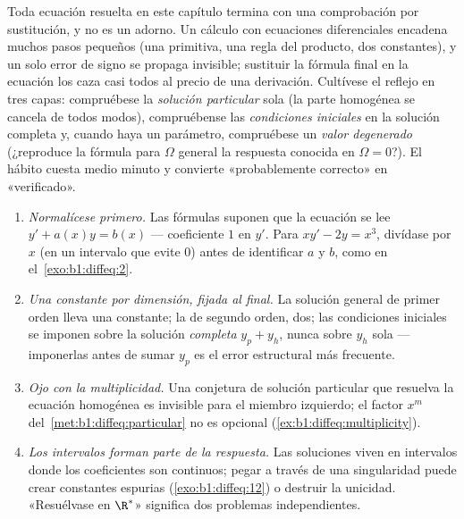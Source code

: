 \begin{remark}\label{rem:b1:diffeq:check}
Toda ecuación resuelta en este capítulo termina con una comprobación
por sustitución, y no es un adorno. Un cálculo con ecuaciones
diferenciales encadena muchos pasos pequeños (una primitiva, una regla
del producto, dos constantes), y un solo error de signo se propaga
invisible; sustituir la fórmula final en la ecuación los caza casi
todos al precio de una derivación. Cultívese el reflejo en tres capas:
compruébese la \emph{solución particular} sola (la parte homogénea se
cancela de todos modos), compruébense las \emph{condiciones iniciales}
en la solución completa y, cuando haya un parámetro, compruébese un
\emph{valor degenerado} (¿reproduce la fórmula para $\Omega$ general la
respuesta conocida en $\Omega = 0$?). El hábito cuesta medio minuto y
convierte «probablemente correcto» en «verificado».
\end{remark}

\begin{remark}\label{rem:b1:diffeq:pitfalls}
\begin{enumerate}
  \item \emph{Normalícese primero.} Las fórmulas suponen que la
        ecuación se lee $y' + a(x)y = b(x)$ --- coeficiente $1$ en
        $y'$. Para $xy' - 2y = x^3$, divídase por $x$ (en un intervalo
        que evite $0$) antes de identificar $a$ y $b$, como en
        el~\cref{exo:b1:diffeq:2}.
  \item \emph{Una constante por dimensión, fijada al final.} La
        solución general de primer orden lleva una constante; la de
        segundo orden, dos; las condiciones iniciales se imponen sobre
        la solución \emph{completa} $y_p + y_h$, nunca sobre $y_h$
        sola --- imponerlas antes de sumar $y_p$ es el error
        estructural más frecuente.
  \item \emph{Ojo con la multiplicidad.} Una conjetura de solución
        particular que resuelva la ecuación homogénea es invisible
        para el miembro izquierdo; el factor $x^m$
        del~\cref{met:b1:diffeq:particular} no es opcional
        (\cref{ex:b1:diffeq:multiplicity}).
  \item \emph{Los intervalos forman parte de la respuesta.} Las
        soluciones viven en intervalos donde los coeficientes son
        continuos; pegar a través de una singularidad puede crear
        constantes espurias (\cref{exo:b1:diffeq:12}) o destruir la
        unicidad. «Resuélvase en $\R^*$» significa dos problemas
        independientes.
\end{enumerate}
\end{remark}

